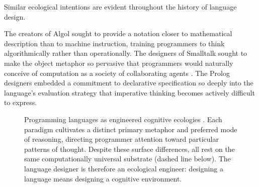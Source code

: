 \documentclass[11pt]{article}
\theoremstyle{definition}
\begin{document}
Similar ecological intentions are evident throughout the history of
language design.

The creators of Algol sought to provide a notation closer to
mathematical description than to machine instruction, training
programmers to think algorithmically rather than operationally. The
designers of Smalltalk sought to make the object metaphor so pervasive
that programmers would naturally conceive of computation as a society
of collaborating agents \cite{floyd1979}. The Prolog designers embedded
a commitment to declarative specification so deeply into the language's
evaluation strategy that imperative thinking becomes actively difficult
to express.

\begin{figure}[ht]
\centering
{}
\caption{Programming languages as engineered cognitive ecologies
\cite{floyd1979,wadler1992}. Each paradigm cultivates a distinct primary
metaphor and preferred mode of reasoning, directing programmer attention
toward particular patterns of thought. Despite these surface differences,
all rest on the same computationally universal substrate (dashed line
below). The language designer is therefore an ecological engineer:
designing a language means designing a cognitive environment.}
\label{fig:lang_ecologies}
\end{figure}
\end{document}
